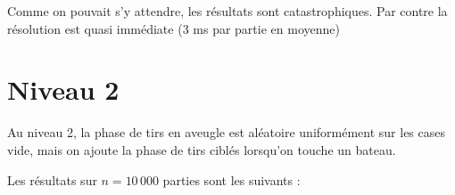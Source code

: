\begin{center}\label{histo_algo}
\end{center}

Comme on pouvait s'y attendre, les résultats sont catastrophiques. Par contre la résolution est quasi immédiate (3 ms par partie en moyenne)
\newpage
\section{Niveau 2}
Au niveau 2, la phase de tirs en aveugle est aléatoire uniformément sur les cases vide, mais on ajoute la phase de tirs ciblés lorsqu'on touche un bateau.

Les résultats sur $n=10\,000$ parties sont les suivants :

 \begin{center}\label{histo_algo}
\end{center}

